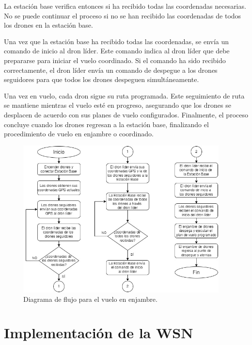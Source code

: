 \noindent La estación base verifica entonces si ha recibido todas las coordenadas necesarias. No se puede continuar el proceso si no se han recibido las coordenadas de todos los drones en la estación base. 

\noindent Una vez que la estación base ha recibido todas las coordenadas, se envía un comando de inicio al dron líder. Este comando indica al dron líder que debe prepararse para iniciar el vuelo coordinado. Si el comando ha sido recibido correctamente, el dron líder envía un comando de despegue a los drones seguidores para que todos los drones despeguen simultáneamente.

\noindent Una vez en vuelo, cada dron sigue su ruta programada. Este seguimiento de ruta se mantiene mientras el vuelo esté en progreso, asegurando que los drones se desplacen de acuerdo con sus planes de vuelo configurados. Finalmente, el proceso concluye cuando los drones regresan a la estación base, finalizando el procedimiento de vuelo en enjambre o coordinado.

\begin{figure}[H]
    \centering
    \includegraphics[width=0.95\textwidth]{imagenes/diagrama-enjambre.jpg}
    \caption{Diagrama de flujo para el vuelo en enjambre.}
    \label{fig:diagrama-vuelo-enjambre}
\end{figure}


\section{Implementación de la WSN}
